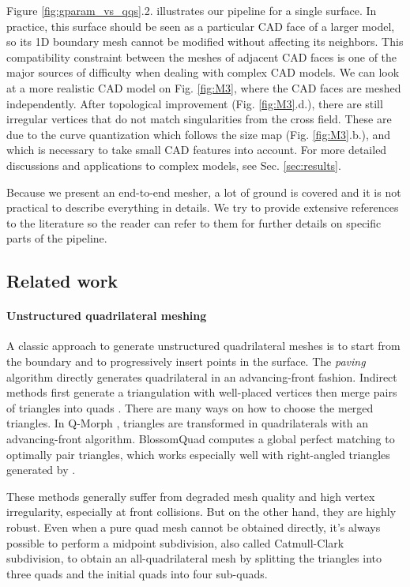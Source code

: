 \documentclass[AMA,STIX1COL]{WileyNJD-v2}
\newcommand\rsec[1]{Sec. \ref{#1}}
\newcommand\rfig[1]{Fig. \ref{#1}}
\begin{document}
{Figure \ref{fig:gparam_vs_qqs}.2. illustrates our pipeline for a single
surface. In practice, this surface should be seen as a particular CAD face of a
larger model, so its 1D boundary mesh cannot be modified without affecting its
neighbors. This compatibility constraint between the meshes of adjacent CAD
faces is one of the major sources of difficulty when dealing with complex CAD 
models. We can look at a more realistic CAD model on \rfig{fig:M3}, where the
CAD faces are meshed independently. After topological improvement (\rfig{fig:M3}.d.),
there are still irregular vertices that do not match singularities from
the cross field. These are due to the curve quantization which follows the
size map (\rfig{fig:M3}.b.), and which is necessary to take small CAD features
into account. For more detailed discussions and applications to complex
models, see \rsec{sec:results}.

Because we present an end-to-end mesher, a lot of ground is covered and it
is not practical to describe everything in details. We try to provide
extensive references to the literature so the reader
can refer to them for further details on specific parts of the pipeline.


\subsection{Related work}
\label{ss:related_work}

\paragraph{Unstructured quadrilateral meshing}
A classic approach to generate unstructured quadrilateral meshes is to start
from the boundary and to progressively insert points in the surface. 
The \emph{paving} algorithm \cite{blacker1991}
directly generates quadrilateral in an advancing-front fashion.
Indirect methods first generate a triangulation with well-placed vertices then merge pairs
of triangles into quads \cite{leeNewSchemeGeneration1994,frey}. 
There are many ways on how to choose the merged triangles. In Q-Morph
\cite{owenQMorphIndirectApproach1999}, triangles are transformed in
quadrilaterals with an advancing-front algorithm. BlossomQuad \cite{blossom}
computes a global perfect matching to optimally pair triangles,
which works especially well with right-angled triangles generated
by \cite{delquad}.

These methods generally suffer from degraded mesh quality and high vertex
irregularity, especially at front collisions.  But on the other hand, they are
highly robust.  Even when a pure quad mesh cannot be obtained directly, it's
always possible to perform a midpoint subdivision, also called Catmull-Clark
subdivision, to obtain an all-quadrilateral mesh by splitting the triangles into
three quads and the initial quads into four sub-quads.



}
\end{document}
